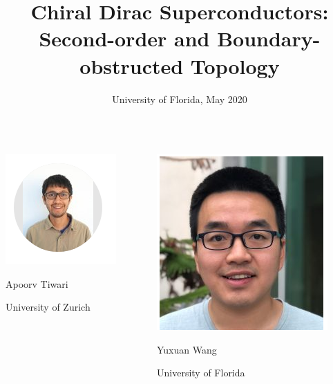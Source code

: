 \documentclass{beamer}
\title{Chiral Dirac Superconductors: Second-order and Boundary-obstructed Topology}
\date{University of Florida, May 2020}
\renewcommand{\(}{\left(}
\renewcommand{\)}{\right)}
\renewcommand{\[}{\left[}
\renewcommand{\]}{\right]}
\begin{document}
\frame{\titlepage} 

\begin{frame}
    \centering
    \begin{columns}
        \begin{column}{0.5\textwidth}
            \centering
            \includegraphics[trim= 0 20 0 20,clip]{Screenshot_20200516_213116.png}

            Apoorv Tiwari
            
            University of Zurich
        \end{column}
        \begin{column}{0.5\textwidth}
            \centering
            \includegraphics[scale=0.4]{YWSC.png}

            Yuxuan Wang 

            University of Florida
        \end{column}
    \end{columns}
\end{frame}
\end{document}
